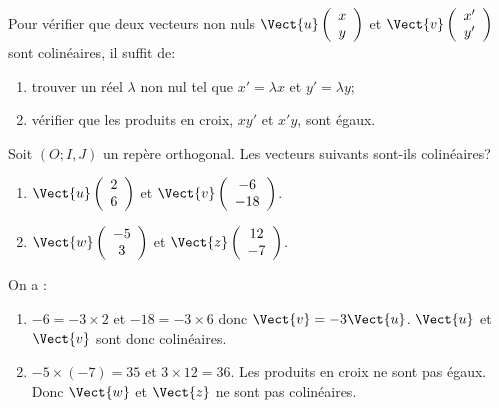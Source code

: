 \documentclass{book}
\begin{document}
 
\begin{Methode}
Pour vérifier que  deux vecteurs non nuls $\Vect{u}\left (\begin{array}{c}
x\\y
\end{array}\right)$ et $\Vect{v}\left(\begin{array}{c}
x'\\y'
\end{array}\right)$  sont colinéaires, il suffit de:
\begin{enumerate}
\item trouver un réel $\lambda$ non nul tel que $x'=\lambda x$ et $y'=\lambda y$; 
\item vérifier que les produits en croix, $xy'$  et $x'y$, sont égaux.
\end{enumerate}

Soit $(O; I, J)$ un repère orthogonal. Les vecteurs suivants sont-ils colinéaires? 
\begin{enumerate}
\item $\Vect{u} \left( \begin{array}{c}
2\\6 
\end{array}
\right)$ et $\Vect{v} \left( \begin{array}{c}
-6 \\ -18
\end{array}
\right)$. 
\item $\Vect{w} \left( \begin{array}{c}
-5 \\ 3\end{array}\right)$ et $\Vect{z} \left( \begin{array}{c}12 \\ -7\end{array}\right)$.
\end{enumerate}
On a :
\begin{enumerate}
\item $-6=-3\times 2$ et $-18=-3\times 6$ donc $\Vect{v}=-3\Vect{u}$.
 $\Vect{u}$ et $\Vect{v}$ sont donc colinéaires.
\item $-5\times(-7)=35$ et $3\times 12=36$.  Les produits en croix ne sont pas égaux.  
  Donc $\Vect{w}$ et $\Vect{z}$ ne sont pas colinéaires.
\end{enumerate}
\end{Methode}
\end{document}
